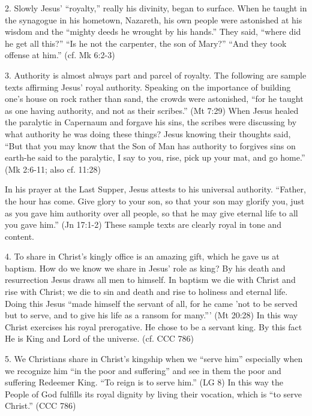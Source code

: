 \documentclass[oneside]{book}
\begin{document}
2. Slowly Jesus' ``royalty,'' really his divinity, began to surface. When he
taught in the synagogue in his hometown, Nazareth, his own people were
astonished at his wisdom and the ``mighty deeds he wrought by his hands.'' They
said, ``where did he get all this?'' ``Is he not the carpenter, the son of
Mary?'' ``And they took offense at him.'' (cf. Mk 6:2-3)

3. Authority is almost always part and parcel of royalty. The following are
sample texts affirming Jesus' royal authority. Speaking on the importance of
building one's house on rock rather than sand, the crowds were astonished, ``for
he taught as one having authority, and not as their scribes.'' (Mt 7:29) When
Jesus healed the paralytic in Capernaum and forgave his sins, the scribes were
discussing by what authority he was doing these things? Jesus knowing their
thoughts said, ``But that you may know that the Son of Man has authority to
forgives sins on earth-he said to the paralytic, I say to you, rise, pick up
your mat, and go home.'' (Mk 2:6-11; also cf. 11:28)

In his prayer at the Last Supper, Jesus attests to his universal
authority. ``Father, the hour has come. Give glory to your son, so that your son
may glorify you, just as you gave him authority over all people, so that he may
give eternal life to all you gave him.'' (Jn 17:1-2) These sample texts are
clearly royal in tone and content.

4. To share in Christ's kingly office is an amazing gift, which he gave us at
baptism. How do we know we share in Jesus' role as king? By his death and
resurrection Jesus draws all men to himself. In baptism we die with Christ and
rise with Christ; we die to sin and death and rise to holiness and eternal
life. Doing this Jesus ``made himself the servant of all, for he came 'not to be
served but to serve, and to give his life as a ransom for many.''' (Mt 20:28) In
this way Christ exercises his royal prerogative. He chose to be a servant
king. By this fact He is King and Lord of the universe. (cf. CCC 786)

5. We Christians share in Christ's kingship when we ``serve him'' especially
when we recognize him ``in the poor and suffering'' and see in them the poor and
suffering Redeemer King. ``To reign is to serve him.'' (LG 8) In this way the
People of God fulfills its royal dignity by living their vocation, which is ``to
serve Christ.'' (CCC 786)
\end{document}

